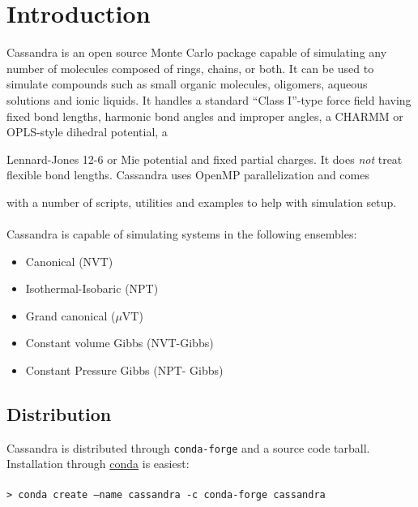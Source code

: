 \chapter{Introduction}
Cassandra is an open source Monte Carlo package capable of simulating
any number of molecules composed of rings, chains, or both. It can be
used to simulate compounds such as small organic molecules, oligomers,
aqueous solutions and ionic liquids. It handles a standard ``Class
I''-type force field having fixed bond lengths, harmonic bond angles
and improper angles, a CHARMM or OPLS-style dihedral potential, a

Lennard-Jones 12-6 or Mie potential and fixed partial charges. It does {\em
  not} treat flexible bond lengths. Cassandra uses OpenMP parallelization and comes

with a number of scripts, utilities and examples to help with
simulation setup. \\ \\ 
%
Cassandra is capable of simulating systems in the following ensembles: \\ 
%
\begin{itemize}
\item Canonical (NVT) 
\item Isothermal-Isobaric (NPT) 
\item Grand canonical ($\mu$VT) 
\item Constant volume Gibbs (NVT-Gibbs) 
\item Constant Pressure Gibbs (NPT- Gibbs)
\end{itemize}

\section{Distribution}
Cassandra is distributed through \texttt{conda-forge} and a source code tarball. Installation
through \href{https://docs.conda.io/en/latest/miniconda.html}{conda} is easiest: \\ \\
%
\texttt{> conda create --name cassandra -c conda-forge cassandra} \\
%

